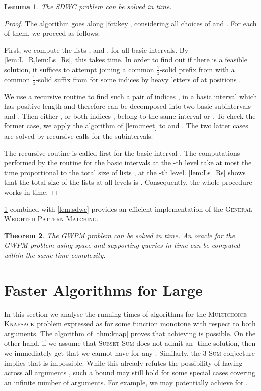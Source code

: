 \documentclass{article}
\theoremstyle{plain}
\newtheorem{theorem}{Theorem}[section]
\newtheorem{lemma}[theorem]{Lemma}
\theoremstyle{definition}
\newcommand{\MK}{\textsc{Multichoice Knapsack}\xspace}
\newcommand{\GWPM}{\textsc{GWPM}\xspace}
\newcommand{\GWPMFull}{\textsc{General Weighted Pattern Matching}\xspace}
\newcommand{\SDWC}{\textsc{SDWC}\xspace}
\newcommand{\SubsetSum}{\textsc{Subset Sum}\xspace}
\newcommand{\Sum}{\textsc{Sum}\xspace}
\newcommand{\fr}{\ensuremath{\frac1z}}
\newcommand{\mayqed}{}
\begin{document}
      \begin{lemma}\label{lem:DWM_hard}
        The \SDWC problem can be solved in  time.
      \end{lemma}
      \begin{proof}
        The algorithm goes along \cref{fct:key}, considering all choices of  and .
        For each of them, we proceed as follows:
        
        First, we compute the lists ,  and ,  for all basic intervals.
        By \cref{lem:L_R,lem:Ls_Rs}, this takes  time.
        In order to find out if there is a feasible solution, it suffices to attempt joining
        a common \fr-solid prefix from  with a common \fr-solid suffix from  for some indices 
        by heavy letters of  at positions .

        We use a recursive routine to find such a pair of indices ,  in a basic interval 
        which has positive length and therefore can be decomposed into two basic subintervals  and .
        Then either , or both indices ,  belong to the same interval  or .
        To check the former case, we apply the algorithm of \cref{lem:meet} to  and .
        The two latter cases are solved by recursive calls for the subintervals.

        The recursive routine is called first for the basic interval .
        The computations performed by the routine for the basic intervals at the -th level
        take at most the time proportional to the total size of lists ,  at the -th level.
        \cref{lem:Ls_Rs} shows that the total size of the lists at all levels is .
        Consequently, the whole procedure works in  time.
      \mayqed\end{proof}
      \cref{lem:DWM_hard} combined with \cref{lem:sdwc} provides an efficient implementation of the \GWPMFull.

    \begin{theorem}\label{lem:gwpm}
    The \GWPM problem can be solved in  time.
     An oracle for the \GWPM problem using  space and supporting queries in  time can be
        computed within the same time complexity.
    \end{theorem}

 


    
    \section{Faster Algorithms for Large }\label{app:fast}
    In this section we analyse the running times of algorithms for the \MK problem expressed
    as   for some function  monotone with respect to both arguments.
    The algorithm of \cref{thm:knap} proves that achieving  is possible. 
    On the other hand, if we assume that \SubsetSum does not admit an -time solution,
    then we immediately get that we cannot have  for any .
    Similarly, the 3-\Sum conjecture implies that  is impossible.
    While this already refutes the possibility of having 
    across all arguments , such a bound may still hold for some special cases covering an infinite number of arguments.
    For example, we may potentially achieve  for .
    
\end{document}
